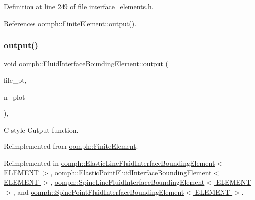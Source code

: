 Definition at line 249 of file interface\+\_\+elements.\+h.



References oomph\+::\+Finite\+Element\+::output().

\mbox{\label{classoomph_1_1FluidInterfaceBoundingElement_ae85ea987a06275a03ad6d0e3710871da}} 
\subsubsection{\texorpdfstring{output()}{output()}\hspace{0.1cm}{\footnotesize\ttfamily [4/4]}}
{\footnotesize\ttfamily void oomph\+::\+Fluid\+Interface\+Bounding\+Element\+::output (\begin{DoxyParamCaption}\item[{F\+I\+LE $\ast$}]{file\+\_\+pt,  }\item[{const unsigned \&}]{n\+\_\+plot }\end{DoxyParamCaption})\hspace{0.3cm}{\ttfamily [inline]}, {\ttfamily [virtual]}}



C-\/style Output function. 



Reimplemented from \hyperlink{classoomph_1_1FiniteElement_adfaee690bb0608f03320eeb9d110d48c}{oomph\+::\+Finite\+Element}.



Reimplemented in \hyperlink{classoomph_1_1ElasticLineFluidInterfaceBoundingElement_a6e4c4d356c7d66f6b5ec4c7a375ecc91}{oomph\+::\+Elastic\+Line\+Fluid\+Interface\+Bounding\+Element$<$ E\+L\+E\+M\+E\+N\+T $>$}, \hyperlink{classoomph_1_1ElasticPointFluidInterfaceBoundingElement_a4b30d56cc1869b5c9c4819843fb65ecc}{oomph\+::\+Elastic\+Point\+Fluid\+Interface\+Bounding\+Element$<$ E\+L\+E\+M\+E\+N\+T $>$}, \hyperlink{classoomph_1_1SpineLineFluidInterfaceBoundingElement_ab1dbf8b8c22f78d08d431e06db80793a}{oomph\+::\+Spine\+Line\+Fluid\+Interface\+Bounding\+Element$<$ E\+L\+E\+M\+E\+N\+T $>$}, and \hyperlink{classoomph_1_1SpinePointFluidInterfaceBoundingElement_a75a530620bfa2a983fec2e1c7f801db2}{oomph\+::\+Spine\+Point\+Fluid\+Interface\+Bounding\+Element$<$ E\+L\+E\+M\+E\+N\+T $>$}.



